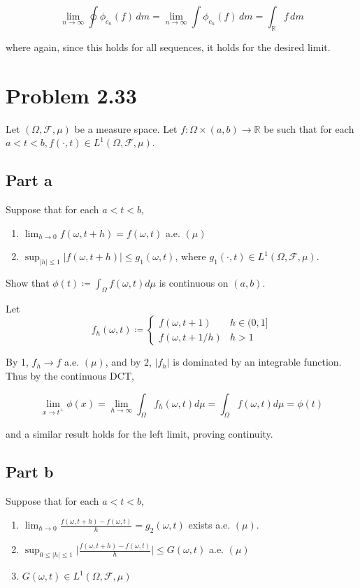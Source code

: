 \documentclass{article}
\newcommand{\R}{\mathbb{R}}
\newcommand{\F}{\mathcal{F}}
\begin{document}
\[
\lim_{n \rightarrow \infty} \oint \phi_{c_n}(f)\,dm = \lim_{n \rightarrow \infty} \int \phi_{c_n}(f)\,dm = \int_\R f\,dm
\]

where again, since this holds for all sequences, it holds for the desired limit.

\section*{Problem 2.33}

Let $(\Omega, \F, \mu)$ be a measure space. Let $f: \Omega \times (a, b) \rightarrow \R$ be such that for each $a < t < b, f(\cdot, t) \in L^1(\Omega, \F, \mu)$.

\subsection*{Part a}

Suppose that for each $a < t < b$,
\begin{enumerate}
\item $\lim_{h \rightarrow 0} f(\omega, t+h) = f(\omega, t)$ a.e. $(\mu)$
\item $\sup_{|h| \leq 1} |f(\omega, t+h)| \leq g_1(\omega, t)$, where $g_1(\cdot, t) \in L^1(\Omega, \F, \mu)$.
\end{enumerate}

Show that $\phi(t) \coloneq \int_\Omega f(\omega, t)d\mu$ is continuous on $(a, b)$.

Let
\[f_h(\omega, t) \coloneq \begin{cases}
f(\omega, t+1) & h \in (0, 1] \\
f(\omega, t + 1/h) & h > 1
\end{cases}
\]

By 1, $f_h \rightarrow f$ a.e. $(\mu)$, and by 2, $|f_h|$ is dominated by an integrable function. Thus by the continuous DCT,

\[
\lim_{x \rightarrow t^+}\phi(x) = \lim_{h\rightarrow \infty}\int_\Omega f_h(\omega, t)d\mu = \int_\Omega f(\omega, t)d\mu = \phi(t)
\]

and a similar result holds for the left limit, proving continuity.

\subsection*{Part b}

Suppose that for each $a < t < b$,
\begin{enumerate}
\item $\lim_{h \rightarrow 0} \frac{f(\omega, t+h) - f(\omega, t)}{h} = g_2(\omega, t)$ exists a.e. $(\mu)$.
\item $\sup_{0 \leq |h| \leq 1} \bigg| \frac{f(\omega, t+h) - f(\omega, t)}{h} \bigg| \leq G(\omega, t)$ a.e. $(\mu)$
\item $G(\omega, t) \in L^1(\Omega, \F, \mu)$
\end{enumerate}
\end{document}
